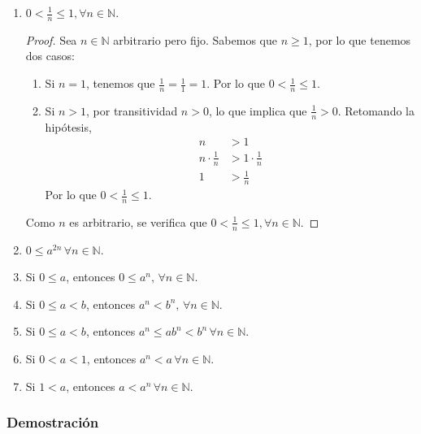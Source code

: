 \documentclass[11pt]{article}
\newcommand{\N}{\mathbb{N}}
\begin{document}
\begin{enumerate}[label=\alph*)]
 \item $0<\frac{1}{n}\leq 1, \forall n\in \N$.
 \begin{proof} 
  Sea $n\in \N$ arbitrario pero fijo. Sabemos que $n\geq 1$, por lo que tenemos dos casos: \begin{enumerate}[label=\roman*)]
   \item Si $n=1$, tenemos que $\frac{1}{n}=\frac{1}{1}=1$. Por lo que $0<\frac{1}{n}\leq 1$.
   \item Si $n>1$, por transitividad $n>0$, lo que implica que $\frac{1}{n}>0$. Retomando la hipótesis, \begin{align*}
    n &> 1\\
    n \cdot \frac{1}{n} &> 1\cdot \frac{1}{n}\\
    1 &> \frac{1}{n}
   \end{align*} Por lo que $0<\frac{1}{n}\leq 1$. 
  \end{enumerate} Como $n$ es arbitrario, se verifica que $0<\frac{1}{n}\leq 1, \forall n\in \N$.
 \end{proof}
 \item $0 \leq a^{2n} \, \forall n\in \N$.
 \item Si $0\leq a$, entonces $ 0 \leq a^n, \, \forall n\in \N$.
 \item Si $0 \leq a <b$, entonces $a^n < b^n, \, \forall n\in \N$.
 \item Si $0 \leq a <b$, entonces $a^n \leq ab^n < b^n \, \forall n\in \N$.
 \item Si $0<a<1$, entonces $a^n<a \, \forall n\in \N$.
 \item Si $1<a$, entonces $a<a^n \, \forall n\in \N$.
\end{enumerate}

\subsubsection*{Demostración}
\end{document}
